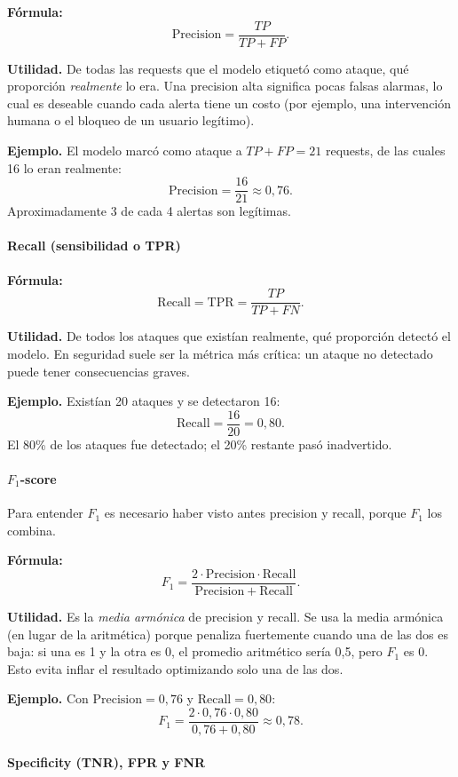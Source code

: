 \documentclass[12pt,oneside]{report}
\begin{document}
\textbf{Fórmula:}
\[
\mathrm{Precision}=\frac{TP}{TP+FP}.
\]

\textbf{Utilidad.} De todas las requests que el modelo etiquetó como
ataque, qué proporción \emph{realmente} lo era. Una precision alta
significa pocas falsas alarmas, lo cual es deseable cuando cada alerta
tiene un costo (por ejemplo, una intervención humana o el bloqueo de un
usuario legítimo).

\textbf{Ejemplo.} El modelo marcó como ataque a $TP+FP=21$ requests, de
las cuales 16 lo eran realmente:
\[
\mathrm{Precision}=\frac{16}{21}\approx 0{,}76.
\]
Aproximadamente 3 de cada 4 alertas son legítimas.

\paragraph{Recall (sensibilidad o TPR)}

\textbf{Fórmula:}
\[
\mathrm{Recall}=\mathrm{TPR}=\frac{TP}{TP+FN}.
\]

\textbf{Utilidad.} De todos los ataques que existían realmente, qué
proporción detectó el modelo. En seguridad suele ser la métrica más
crítica: un ataque no detectado puede tener consecuencias graves.

\textbf{Ejemplo.} Existían 20 ataques y se detectaron 16:
\[
\mathrm{Recall}=\frac{16}{20}=0{,}80.
\]
El 80\% de los ataques fue detectado; el 20\% restante pasó inadvertido.

\paragraph{$F_1$-score}

Para entender $F_1$ es necesario haber visto antes precision y recall,
porque $F_1$ los combina.

\textbf{Fórmula:}
\[
F_1=\frac{2\cdot \mathrm{Precision}\cdot \mathrm{Recall}}{\mathrm{Precision}+\mathrm{Recall}}.
\]

\textbf{Utilidad.} Es la \emph{media armónica} de precision y recall. Se
usa la media armónica (en lugar de la aritmética) porque penaliza
fuertemente cuando una de las dos es baja: si una es 1 y la otra es 0,
el promedio aritmético sería 0{,}5, pero $F_1$ es 0. Esto evita inflar
el resultado optimizando solo una de las dos.

\textbf{Ejemplo.} Con $\mathrm{Precision}=0{,}76$ y $\mathrm{Recall}=0{,}80$:
\[
F_1=\frac{2\cdot 0{,}76\cdot 0{,}80}{0{,}76+0{,}80}\approx 0{,}78.
\]

\paragraph{Specificity (TNR), FPR y FNR}
\end{document}

